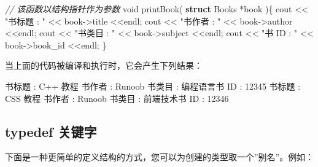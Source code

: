 \documentclass[
]{article}
\newenvironment{Shaded}{}{}
\newcommand{\CommentTok}[1]{\textcolor[rgb]{0.38,0.63,0.69}{\textit{#1}}}
\newcommand{\DataTypeTok}[1]{\textcolor[rgb]{0.56,0.13,0.00}{#1}}
\newcommand{\DecValTok}[1]{\textcolor[rgb]{0.25,0.63,0.44}{#1}}
\newcommand{\KeywordTok}[1]{\textcolor[rgb]{0.00,0.44,0.13}{\textbf{#1}}}
\newcommand{\NormalTok}[1]{#1}
\newcommand{\OperatorTok}[1]{\textcolor[rgb]{0.40,0.40,0.40}{#1}}
\newcommand{\StringTok}[1]{\textcolor[rgb]{0.25,0.44,0.63}{#1}}
\begin{document}
\begin{Shaded}
\begin{Highlighting}[]
\CommentTok{// 该函数以结构指针作为参数}
\DataTypeTok{void}\NormalTok{ printBook}\OperatorTok{(} \KeywordTok{struct}\NormalTok{ Books }\OperatorTok{*}\NormalTok{book }\OperatorTok{)\{}
\NormalTok{   cout }\OperatorTok{\textless{}\textless{}} \StringTok{"书标题  : "} \OperatorTok{\textless{}\textless{}}\NormalTok{ book}\OperatorTok{{-}\textgreater{}}\NormalTok{title }\OperatorTok{\textless{}\textless{}}\NormalTok{endl}\OperatorTok{;}   
\NormalTok{   cout }\OperatorTok{\textless{}\textless{}} \StringTok{"书作者 : "}  \OperatorTok{\textless{}\textless{}}\NormalTok{ book}\OperatorTok{{-}\textgreater{}}\NormalTok{author }\OperatorTok{\textless{}\textless{}}\NormalTok{endl}\OperatorTok{;}   
\NormalTok{   cout }\OperatorTok{\textless{}\textless{}} \StringTok{"书类目 : "} \OperatorTok{\textless{}\textless{}}\NormalTok{ book}\OperatorTok{{-}\textgreater{}}\NormalTok{subject }\OperatorTok{\textless{}\textless{}}\NormalTok{endl}\OperatorTok{;}   
\NormalTok{   cout }\OperatorTok{\textless{}\textless{}} \StringTok{"书 ID : "} \OperatorTok{\textless{}\textless{}}\NormalTok{ book}\OperatorTok{{-}\textgreater{}}\NormalTok{book\_id }\OperatorTok{\textless{}\textless{}}\NormalTok{endl}\OperatorTok{;}
\OperatorTok{\}}
\end{Highlighting}
\end{Shaded}

当上面的代码被编译和执行时，它会产生下列结果：

\begin{Shaded}
\begin{Highlighting}[]
\NormalTok{书标题  }\OperatorTok{:}\NormalTok{ C}\OperatorTok{++}\NormalTok{ 教程}
\NormalTok{书作者 }\OperatorTok{:}\NormalTok{ Runoob}
\NormalTok{书类目 }\OperatorTok{:}\NormalTok{ 编程语言书 }
\NormalTok{ID }\OperatorTok{:} \DecValTok{12345}
\NormalTok{书标题  }\OperatorTok{:}\NormalTok{ CSS 教程}
\NormalTok{书作者 }\OperatorTok{:}\NormalTok{ Runoob}
\NormalTok{书类目 }\OperatorTok{:}\NormalTok{ 前端技术书 }
\NormalTok{ID }\OperatorTok{:} \DecValTok{12346}
\end{Highlighting}
\end{Shaded}

\hypertarget{typedef-ux5173ux952eux5b57}{%
\subsection{typedef 关键字}\label{typedef-ux5173ux952eux5b57}}

下面是一种更简单的定义结构的方式，您可以为创建的类型取一个''别名''。例如：
\end{document}
